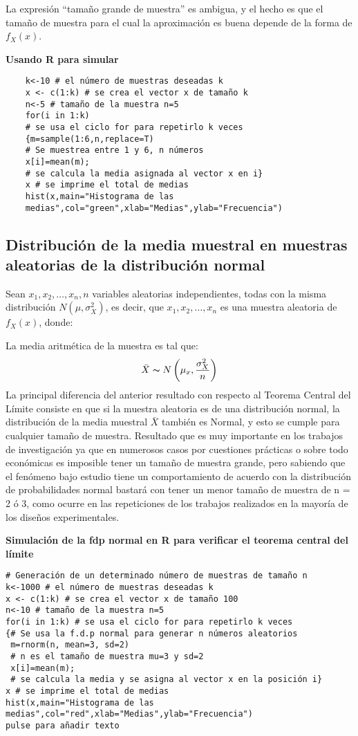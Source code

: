 La expresión ``tamaño grande de muestra'' es
ambigua, y el hecho es que el tamaño de muestra
para el cual la aproximación es buena depende de la
forma de $f_X(x)$.

\textbf{Usando R para simular}

\begin{verbatim}
    k<-10 # el número de muestras deseadas k
    x <- c(1:k) # se crea el vector x de tamaño k
    n<-5 # tamaño de la muestra n=5
    for(i in 1:k) 
    # se usa el ciclo for para repetirlo k veces
    {m=sample(1:6,n,replace=T) 
    # Se muestrea entre 1 y 6, n números
    x[i]=mean(m); 
    # se calcula la media asignada al vector x en i}
    x # se imprime el total de medias
    hist(x,main="Histograma de las
    medias",col="green",xlab="Medias",ylab="Frecuencia")
\end{verbatim}

\subsection{Distribución de la media muestral en muestras aleatorias de la distribución normal}
Sean $x_1,x_2,\dots ,x_n, n$ variables aleatorias independientes, todas con la misma distribución $N(\mu ,\sigma_X^2)$, es decir, que $x_1,x_2,\dots ,x_n$ es una muestra aleatoria de $f_X(x)$, donde:

La media aritmética de la muestra es tal que:
\begin{equation*}
    \bar{X} \thicksim  N\left(\mu_x,\frac{\sigma_X^2}{n}\right)
\end{equation*}
La principal diferencia del anterior resultado con respecto al
Teorema Central del Límite consiste en que si la muestra
aleatoria es de una distribución normal, la distribución de la
media muestral $\bar{X}$ también es Normal, y esto se cumple para
cualquier tamaño de muestra.
Resultado que es muy importante en los trabajos de
investigación ya que en numerosos casos por cuestiones
prácticas o sobre todo económicas es imposible tener un tamaño
de muestra grande, pero sabiendo que el fenómeno bajo estudio
tiene un comportamiento de acuerdo con la distribución de
probabilidades normal bastará con tener un menor tamaño de
muestra de n = 2 ó 3, como ocurre en las repeticiones de los
trabajos realizados en la mayoría de los diseños experimentales.

\textbf{Simulación de la fdp normal en R para verificar el teorema central del límite}

\begin{verbatim}
# Generación de un determinado número de muestras de tamaño n
k<-1000 # el número de muestras deseadas k
x <- c(1:k) # se crea el vector x de tamaño 100
n<-10 # tamaño de la muestra n=5
for(i in 1:k) # se usa el ciclo for para repetirlo k veces
{# Se usa la f.d.p normal para generar n números aleatorios
 m=rnorm(n, mean=3, sd=2) 
 # n es el tamaño de muestra mu=3 y sd=2
 x[i]=mean(m); 
 # se calcula la media y se asigna al vector x en la posición i}
x # se imprime el total de medias
hist(x,main="Histograma de las
medias",col="red",xlab="Medias",ylab="Frecuencia")
pulse para añadir texto
\end{verbatim}


